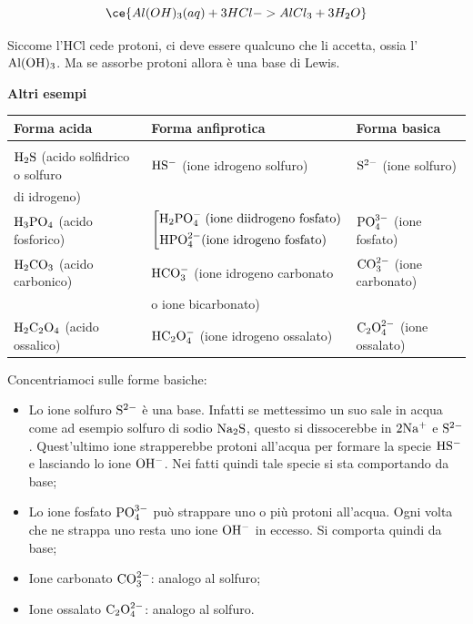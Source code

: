 $$\ce{Al(OH)_3(aq) + 3HCl -> AlCl_3 + 3H_2O}$$

Siccome l'HCl cede protoni, ci deve essere qualcuno che li accetta, ossia l'$\rm Al(OH)_3$. Ma se assorbe protoni allora è una base di Lewis.

\vspace{0.2cm}\textbf{Altri esempi}

\vspace{-0.3cm}\begin{center}
    \footnotesize\begin{tabular}{|p{5.2cm}p{5.4cm}p{3.8cm}|}
    \hline
    \textbf{Forma acida} & \textbf{Forma anfiprotica} & \textbf{Forma basica}\\
    \hline
    &&\\[-1.2ex]
    $\rm H_2S$ (acido solfidrico o solfuro & $\rm HS^-$ (ione idrogeno solfuro) & $\rm S^{2-}$ (ione solfuro)\\
    di idrogeno)&&\\[0.7ex]
    $\rm H_3PO_4$ (acido fosforico) &  \hspace{-0.2cm}$\left[
\begin{aligned}
    \text{H}_2\text{PO}_4^- \; \text{(ione diidrogeno fosfato)}\\
    \text{HPO}_4^{2-} \text{(ione idrogeno fosfato)} \hspace{0.4cm}
\end{aligned}
\right .$
 & $\rm PO_4^{3-}$ (ione fosfato)\\[3ex]
 $\rm H_2CO_3$ (acido carbonico) & $\rm HCO_3^-$ (ione idrogeno carbonato& $\rm CO_3^{2-}$ (ione carbonato)\\
 & o ione bicarbonato) &\\[0.7ex]
 $\rm H_2C_2O_4$ (acido ossalico) & $\rm HC_2O_4^-$ (ione idrogeno ossalato) & $\rm C_2O_4^{2-}$ (ione ossalato)\\[0.7ex]
 \hline
    \end{tabular}
\end{center}

Concentriamoci sulle forme basiche:

\begin{itemize}
    \item Lo ione solfuro $\rm S^{2-}$ è una base. Infatti se mettessimo un suo sale in acqua come ad esempio solfuro di sodio $\rm Na_2S$, questo si dissocerebbe in $\rm 2Na^+$ e $\rm S^{2-}$. Quest'ultimo ione strapperebbe protoni all'acqua per formare la specie $\rm HS^-$ e lasciando lo ione $\rm OH^-$. Nei fatti quindi tale specie si sta comportando da base;
    \item Lo ione fosfato $\rm PO_4^{3-}$ può strappare uno o più protoni all'acqua. Ogni volta che ne strappa uno resta uno ione $\rm OH^-$ in eccesso. Si comporta quindi da base;
    \item Ione carbonato $\rm CO_3^{2-}$: analogo al solfuro;
    \item Ione ossalato $\rm C_2O_4^{2-}$: analogo al solfuro.
\end{itemize}

